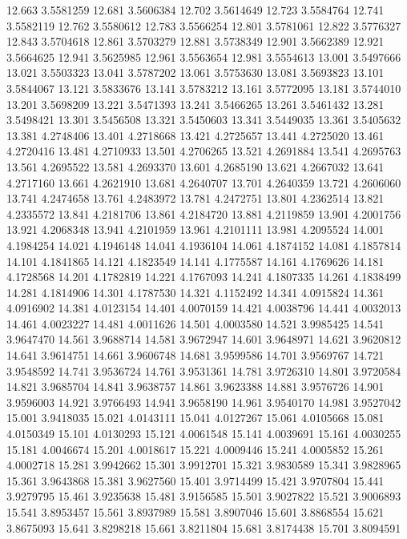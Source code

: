 12.663 3.5581259
12.681 3.5606384
12.702 3.5614649
12.723 3.5584764
12.741 3.5582119
12.762 3.5580612
12.783 3.5566254
12.801 3.5781061
12.822 3.5776327
12.843 3.5704618
12.861 3.5703279
12.881 3.5738349
12.901 3.5662389
12.921 3.5664625
12.941 3.5625985
12.961 3.5563654
12.981 3.5554613
13.001 3.5497666
13.021 3.5503323
13.041 3.5787202
13.061 3.5753630
13.081 3.5693823
13.101 3.5844067
13.121 3.5833676
13.141 3.5783212
13.161 3.5772095
13.181 3.5744010
13.201 3.5698209
13.221 3.5471393
13.241 3.5466265
13.261 3.5461432
13.281 3.5498421
13.301 3.5456508
13.321 3.5450603
13.341 3.5449035
13.361 3.5405632
13.381 4.2748406
13.401 4.2718668
13.421 4.2725657
13.441 4.2725020
13.461 4.2720416
13.481 4.2710933
13.501 4.2706265
13.521 4.2691884
13.541 4.2695763
13.561 4.2695522
13.581 4.2693370
13.601 4.2685190
13.621 4.2667032
13.641 4.2717160
13.661 4.2621910
13.681 4.2640707
13.701 4.2640359
13.721 4.2606060
13.741 4.2474658
13.761 4.2483972
13.781 4.2472751
13.801 4.2362514
13.821 4.2335572
13.841 4.2181706
13.861 4.2184720
13.881 4.2119859
13.901 4.2001756
13.921 4.2068348
13.941 4.2101959
13.961 4.2101111
13.981 4.2095524
14.001 4.1984254
14.021 4.1946148
14.041 4.1936104
14.061 4.1874152
14.081 4.1857814
14.101 4.1841865
14.121 4.1823549
14.141 4.1775587
14.161 4.1769626
14.181 4.1728568
14.201 4.1782819
14.221 4.1767093
14.241 4.1807335
14.261 4.1838499
14.281 4.1814906
14.301 4.1787530
14.321 4.1152492
14.341 4.0915824
14.361 4.0916902
14.381 4.0123154
14.401 4.0070159
14.421 4.0038796
14.441 4.0032013
14.461 4.0023227
14.481 4.0011626
14.501 4.0003580
14.521 3.9985425
14.541 3.9647470
14.561 3.9688714
14.581 3.9672947
14.601 3.9648971
14.621 3.9620812
14.641 3.9614751
14.661 3.9606748
14.681 3.9599586
14.701 3.9569767
14.721 3.9548592
14.741 3.9536724
14.761 3.9531361
14.781 3.9726310
14.801 3.9720584
14.821 3.9685704
14.841 3.9638757
14.861 3.9623388
14.881 3.9576726
14.901 3.9596003
14.921 3.9766493
14.941 3.9658190
14.961 3.9540170
14.981 3.9527042
15.001 3.9418035
15.021 4.0143111
15.041 4.0127267
15.061 4.0105668
15.081 4.0150349
15.101 4.0130293
15.121 4.0061548
15.141 4.0039691
15.161 4.0030255
15.181 4.0046674
15.201 4.0018617
15.221 4.0009446
15.241 4.0005852
15.261 4.0002718
15.281 3.9942662
15.301 3.9912701
15.321 3.9830589
15.341 3.9828965
15.361 3.9643868
15.381 3.9627560
15.401 3.9714499
15.421 3.9707804
15.441 3.9279795
15.461 3.9235638
15.481 3.9156585
15.501 3.9027822
15.521 3.9006893
15.541 3.8953457
15.561 3.8937989
15.581 3.8907046
15.601 3.8868554
15.621 3.8675093
15.641 3.8298218
15.661 3.8211804
15.681 3.8174438
15.701 3.8094591
